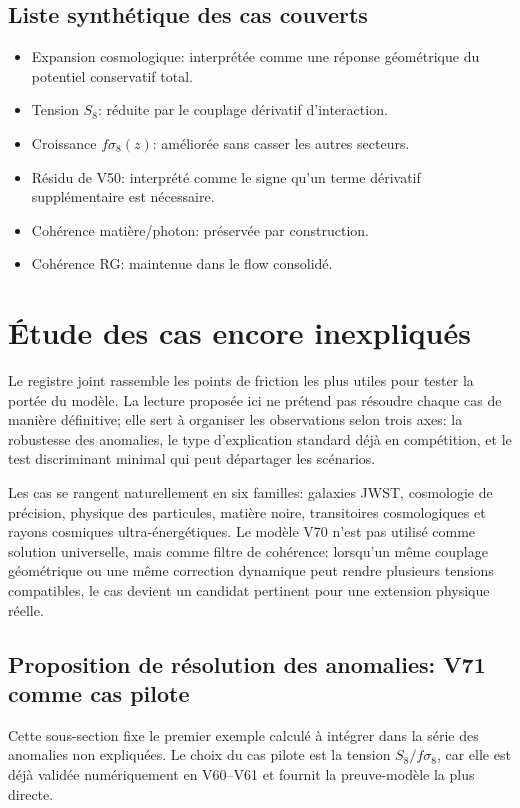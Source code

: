 \documentclass[11pt,a4paper]{article}
\begin{document}
\subsection{Liste synthétique des cas couverts}
\begin{itemize}
	\item Expansion cosmologique: interprétée comme une réponse géométrique du potentiel conservatif total.
	\item Tension $S_8$: réduite par le couplage dérivatif d'interaction.
	\item Croissance $f\sigma_8(z)$: améliorée sans casser les autres secteurs.
	\item Résidu de V50: interprété comme le signe qu'un terme dérivatif supplémentaire est nécessaire.
	\item Cohérence matière/photon: préservée par construction.
	\item Cohérence RG: maintenue dans le flow consolidé.
\end{itemize}

\section{Étude des cas encore inexpliqués}
Le registre joint rassemble les points de friction les plus utiles pour tester la portée du modèle. La lecture proposée ici ne prétend pas résoudre chaque cas de manière définitive; elle sert à organiser les observations selon trois axes: la robustesse des anomalies, le type d'explication standard déjà en compétition, et le test discriminant minimal qui peut départager les scénarios.

Les cas se rangent naturellement en six familles: galaxies JWST, cosmologie de précision, physique des particules, matière noire, transitoires cosmologiques et rayons cosmiques ultra-énergétiques. Le modèle V70 n'est pas utilisé comme solution universelle, mais comme filtre de cohérence: lorsqu'un même couplage géométrique ou une même correction dynamique peut rendre plusieurs tensions compatibles, le cas devient un candidat pertinent pour une extension physique réelle.

\subsection{Proposition de résolution des anomalies: V71 comme cas pilote}
Cette sous-section fixe le premier exemple calculé à intégrer dans la série des anomalies non expliquées. Le choix du cas pilote est la tension $S_8 / f\sigma_8$, car elle est déjà validée numériquement en V60--V61 et fournit la preuve-modèle la plus directe.
\end{document}
